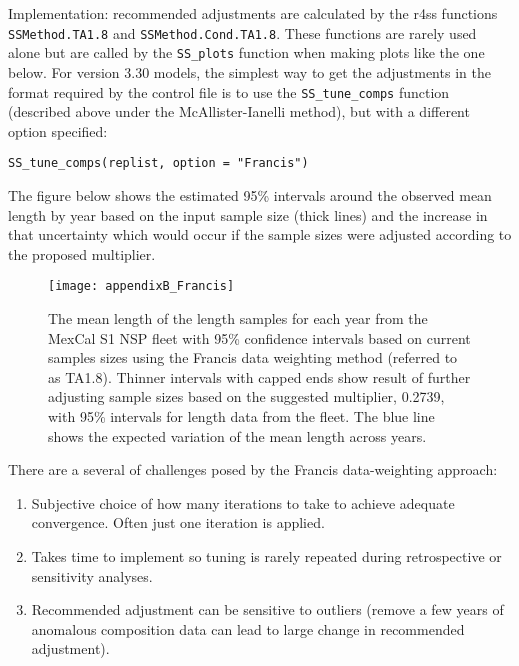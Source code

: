 Implementation: recommended adjustments are calculated by the r4ss functions \texttt{SSMethod.TA1.8} and \texttt{SSMethod.Cond.TA1.8}. These functions are rarely used alone but are called by the \texttt{SS\_plots} function when making plots like the one below. For version 3.30 models, the simplest way to get the adjustments in the format required by the control file is to use the \texttt{SS\_tune\_comps} function (described above under the McAllister-Ianelli method), but with a different option specified: 

\texttt{SS\_tune\_comps(replist, option = "Francis")}

The figure below shows the estimated 95\% intervals around the observed mean length by year based on the input sample size (thick lines) and the increase in that uncertainty which would occur if the sample sizes were adjusted according to the proposed multiplier.

\begin{figure}[ht]
	\begin{center}
		\texttt{[image: appendixB\_Francis]}\\
	\end{center}
	\caption{The mean length of the length samples for each year from the MexCal S1 NSP fleet with 95\% confidence intervals based on current samples sizes using the Francis data weighting method (referred to as TA1.8). Thinner intervals with capped ends show result of further adjusting sample sizes based on the suggested multiplier, 0.2739, with 95\% intervals for length data from the fleet. The blue line shows the expected variation of the mean length across years.}
	\label{fig:francis}
\end{figure}

There are a several of challenges posed by the Francis data-weighting approach:
\begin{enumerate}
	\item Subjective choice of how many iterations to take to achieve adequate convergence. Often just one iteration is applied.
	
	\item Takes time to implement so tuning is rarely repeated during retrospective or sensitivity analyses.
	
	\item Recommended adjustment can be sensitive to outliers (remove a few years of anomalous composition data can lead to large change in recommended adjustment).
\end{enumerate}

